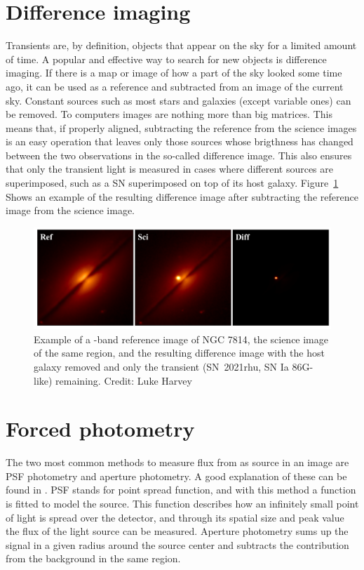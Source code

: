 \documentclass[a4paper,oneside,12pt, class=Latex/Classes/PhDthesisPSnPDF, crop=false]{standalone}
\begin{document}
\section{Difference imaging}
Transients are, by definition, objects that appear on the sky for a limited amount of time. A popular and effective way to search for new objects is difference imaging. If there is a map or image of how a part of the sky looked some time ago, it can be used as a reference and subtracted from an image of the current sky. Constant sources such as most stars and galaxies (except variable ones) can be removed. To computers images are nothing more than big matrices. This means that, if properly aligned, subtracting the reference from the science images is an easy operation that leaves only those sources whose brigthness has changed between the two observations in the so-called difference image. This also ensures that only the transient light is measured in cases where different sources are superimposed, such as a SN superimposed on top of its host galaxy. Figure~\ref{diff_im_example} Shows an example of the resulting difference image after subtracting the reference image from the science image.

\begin{figure}
    \centering
    \includegraphics[width=\textwidth]{../Images/chapter_2/diff_im_SN2021rhu.png}
    \caption{Example of a \ztfr-band reference image of NGC 7814, the science image of the same region, and the resulting difference image with the host galaxy removed and only the transient (SN~2021rhu, SN Ia 86G-like) remaining. Credit: Luke Harvey}
    \label{diff_im_example}
\end{figure}

\section{Forced photometry}
The two most common methods to measure flux from as source in an image are PSF photometry and aperture photometry. A good explanation of these can be found in \citet{Photometry_techniques}. PSF stands for point spread function, and with this method a function is fitted to model the source. This function describes how an infinitely small point of light is spread over the detector, and through its spatial size and peak value the flux of the light source can be measured. Aperture photometry sums up the signal in a given radius around the source center and subtracts the contribution from the background in the same region.
\end{document}
